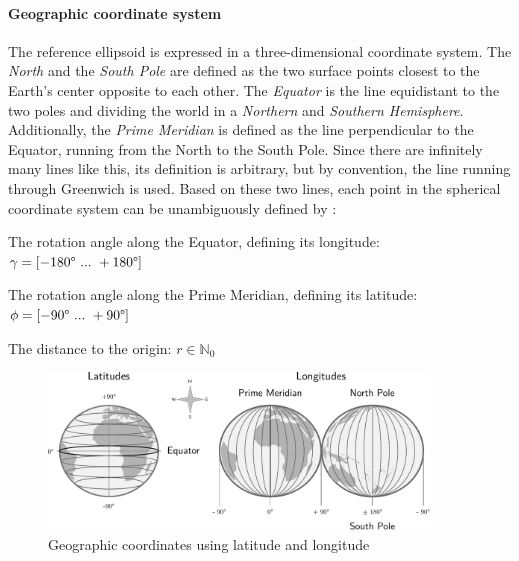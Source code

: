 
\paragraph{Geographic coordinate system} %
\label{ssub:geographic_coordinate_system}

The reference ellipsoid is expressed in a three-dimensional coordinate system. The \emph{North} and the \emph{South Pole} are defined as the two surface points closest to the Earth's center opposite to each other. The \emph{Equator} is the line equidistant to the two poles and dividing the world in a \emph{Northern} and \emph{Southern Hemisphere}. Additionally, the \emph{Prime Meridian} is defined as the line perpendicular to the Equator, running from the North to the South Pole. Since there are infinitely many lines like this, its definition is arbitrary, but by convention, the line running through Greenwich is used. Based on these two lines, each point in the spherical coordinate system can be unambiguously defined by
\cite[pp. 26-28]{bolstad2008gis}:

\begin{compactenum}
  \item The rotation angle along the Equator, defining its longitude: $\gamma = [-180\degree ~...~ +180\degree]$
  \item The rotation angle along the Prime Meridian, defining its latitude: $\phi = [-90\degree ~...~ +90\degree]$
  \item The distance to the origin: $r \in \mathbb{N}_0$
\end{compactenum}

\begin{figure}[ht]
  \vspace{0.5em}
  \centering
  \includegraphics[width=0.9\textwidth]{graphics/basics/hgis/geo_coordinates}
  \caption{Geographic coordinates using latitude and longitude}
  \label{fig:geo-coordinates}
\end{figure}

